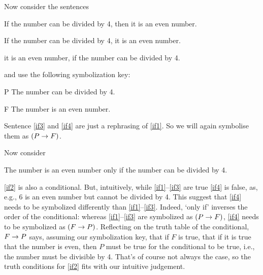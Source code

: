 \noindent Now consider the sentences
\begin{earg}
	\item[\ex{if1}] If the number can be divided by 4, then it is an even number.
		\item[\ex{if3}] If the number can be divided by 4, it is an even number.
		\item[\ex{if4}] it is an even number, if the number can be divided by 4.
\end{earg}

and use the following symbolization key:
	\begin{ekey}
		\item[P] The number can be divided by 4.
		\item[F] The number is an even number.
	\end{ekey}
Sentence \ref{if3} and \ref{if4} are just a rephrasing of \ref{if1}. So we will again symbolise them as $(P\rightarrow F)$.

Now consider
\begin{earg}
		\item[\ex{if2}] The number is an even number only if the number can be divided by 4.
\end{earg}

\ref{if2} is also a conditional. But, intuitively, while \ref{if1}--\ref{if3} are true \ref{if4} is false, as, e.g., 6 is an even number but cannot be divided by 4. This suggest that \ref{if4} needs to be symbolized differently than \ref{if1}--\ref{if3}. Indeed, `only if' inverses the order of the conditional: whereas \ref{if1}--\ref{if3} are symbolized as $(P\rightarrow F)$, \ref{if4} needs to be symbolized as $(F\rightarrow P)$. Reflecting on the truth table of the conditional, $F\rightarrow P$ says, assuming our symbolization key, that if $F$ is true, that if it is true that the number is even, then $P$ must be true for the conditional to be true, i.e., the number must be divisible by 4. That's of course not always the case, so the truth conditions for \ref{if2} fits with our intuitive judgement.


